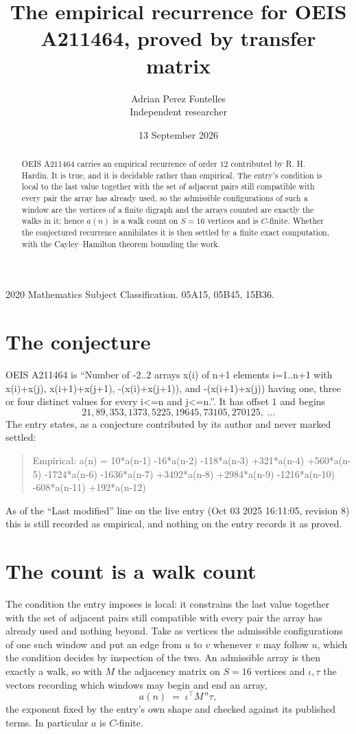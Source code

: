 \documentclass[11pt,a4paper]{article}
\title{The empirical recurrence for OEIS A211464, proved by transfer matrix}
\author{Adrian Perez Fontelles\\ \small Independent researcher}
\date{13 September 2026}
\theoremstyle{plain}
\theoremstyle{definition}
\begin{document}
\maketitle

\begin{abstract}
OEIS A211464 carries an empirical recurrence of order $12$ contributed by R. H. Hardin. It is
true, and it is decidable rather than empirical. The entry's condition is local to the last value together with the set of adjacent pairs still compatible with every pair the array has already used, so
the admissible configurations of such a window are the vertices of a finite digraph and the
arrays counted are exactly the walks in it; hence $a(n)$ is a walk count on $S=16$ vertices
and is $C$-finite. Whether the conjectured recurrence annihilates it is then settled by a
finite exact computation, with the Cayley--Hamilton theorem bounding the work.
\end{abstract}

\noindent\small 2020 Mathematics Subject Classification. 05A15, 05B45, 15B36.\normalsize

\section{The conjecture}

OEIS A211464 is ``Number of -2..2 arrays x(i) of n+1 elements i=1..n+1 with x(i)+x(j), x(i+1)+x(j+1), -(x(i)+x(j+1)), and -(x(i+1)+x(j)) having one, three or four distinct values for every i<=n and j<=n.''. It has offset $1$ and begins
\[
21, 89, 353, 1373, 5225, 19645, 73105, 270125,\ \dots
\]
The entry states, as a conjecture contributed by its author and never marked settled:
\begin{quote}
Empirical: a(n) = 10*a(n-1) -16*a(n-2) -118*a(n-3) +321*a(n-4) +560*a(n-5) -1724*a(n-6) -1636*a(n-7) +3492*a(n-8) +2984*a(n-9) -1216*a(n-10) -608*a(n-11) +192*a(n-12)
\end{quote}
As of the ``Last modified'' line on the live entry (Oct 03 2025 16:11:05, revision 8) this is still
recorded as empirical, and nothing on the entry records it as proved.

\section{The count is a walk count}

The condition the entry imposes is local: it constrains the last value together with the set of adjacent pairs still compatible with every pair the array has already used and nothing beyond. Take as
vertices the admissible configurations of one such window and put an edge from $u$ to $v$
whenever $v$ may follow $u$, which the condition decides by inspection of the two. An
admissible array is then exactly a walk, so with $M$ the adjacency matrix on $S=16$ vertices
and $\iota,\tau$ the vectors recording which windows may begin and end an array,
\[
a(n)\;=\;\iota^{\!\top}M^{\,n}\tau ,
\]
the exponent fixed by the entry's own shape and checked against its published terms. In
particular $a$ is $C$-finite.
\end{document}
